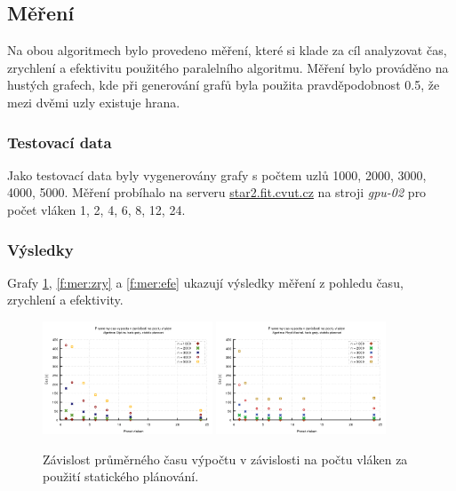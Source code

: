 

\subsection{Měření}
Na obou algoritmech bylo provedeno měření, které si klade za cíl analyzovat čas, zrychlení a efektivitu použitého paralelního algoritmu. Měření bylo prováděno na hustých grafech, kde při generování grafů byla použita pravděpodobnost 0.5, že mezi dvěmi uzly existuje hrana.

\subsubsection{Testovací data}
Jako testovací data byly vygenerovány grafy s počtem uzlů 1000, 2000, 3000, 4000, 5000. Měření probíhalo na serveru \url{star2.fit.cvut.cz} na stroji \textit{gpu-02} pro počet vláken 1, 2, 4, 6, 8, 12, 24.

\subsubsection{Výsledky}
Grafy \ref{f:mer:cas}, \ref{f:mer:zry} a \ref{f:mer:efe} ukazují výsledky měření z pohledu času, zrychlení a efektivity.

\begin{figure}
    \centering
    \includegraphics[width=0.45\textwidth]{../grafy/02_openMP/02-01-Dijsktra_cas}
    \includegraphics[width=0.45\textwidth]{../grafy/02_openMP/02-01-Floyd_cas}
    \caption{Závislost průměrného času výpočtu v závislosti na počtu vláken za použití statického plánování.}
    \label{f:mer:cas}
\end{figure}

